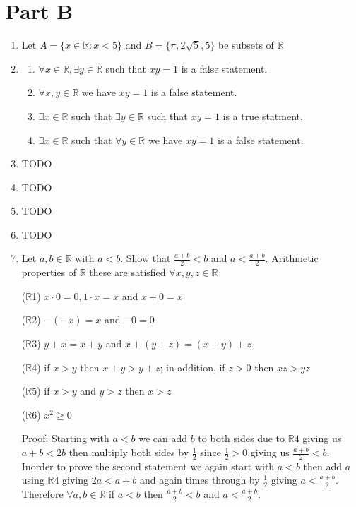 \documentclass[11pt,a4paper]{article}
\newcommand{\Z}{\mathbb{Z}}
\newcommand{\R}{\mathbb{R}}
\begin{document}
\section*{Part B}
    \begin{enumerate}
        \item Let $A = \{ x \in \R : x < 5\}$  and $B = \{\pi, 2\sqrt{5}, 5\}$ be subsets of $\R$ 
        \item \begin{enumerate}
            \item $\forall x \in \R , \exists y \in \R$ such that $xy = 1$ is a false statement.
            \item $\forall x,y \in \R$ we have $xy = 1$ is a false statement.
            \item$\exists x \in \R$ such that $\exists y \in \R$ such that $xy = 1$ is a true statment.
            \item $\exists x \in \R$ such that $\forall y \in \R$ we have $xy = 1$ is a false statement.
        \end{enumerate}
        \item TODO
        \item TODO
        \item TODO
        \item TODO
        \item Let $a, b \in \R $ with $a < b$. Show that $ < b$ and $a < $.
        Arithmetic properties of $\R$ these are satisfied $\forall x,y,z \in \R$

        ($\R$1) $x  = 0, 1 \cdot x = x$ and $x + 0 = x$

        ($\R$2) $- (-x) = x $ and $ -0 = 0$ 

        ($\R$3) $y + x = x + y$ and $x + ( y + z) = (x + y) + z$

        ($\R$4) if $x > y$ then $x + y > y + z$; in addition, if $ z > 0$ then $xz  > yz$

        ($\R$5) if $ x > y$ and $y > z$ then $x > z$

        ($\R$6) $x^2 $

        Proof:
        Starting with $a < b$ we can add $b$ to both sides due to $\R4$ giving us $a + b < 2b$ then multiply both sides by $$ since $ > 0$ giving us $ < b$. Inorder to prove the second statement we again start with $a < b$ then add $a$ using $\R 4$ giving $2a < a + b$ and again times through by $$ giving $a < $. Therefore $\forall a,b \in \R $ if $a < b$ then $ < b$ and $a < $.

    \end{enumerate}
\end{document}
